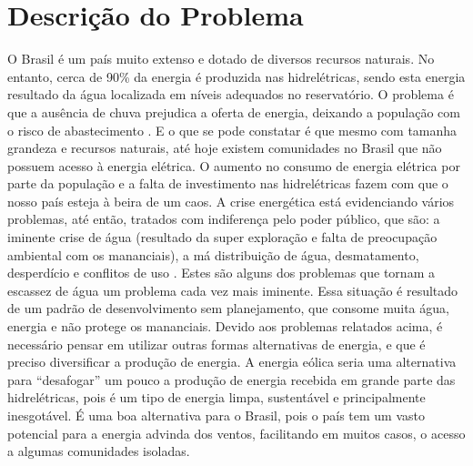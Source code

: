 \chapter[Descrição do Problema]{Descrição do Problema}

O Brasil é um país muito extenso e dotado de diversos recursos naturais. No entanto, cerca de 90\% da energia é produzida nas hidrelétricas, sendo esta energia  resultado da água localizada em níveis adequados no reservatório. O problema é que a ausência de chuva prejudica a oferta de energia, deixando a população com o risco de abastecimento . E o que se pode constatar é que mesmo com tamanha grandeza e recursos naturais, até hoje existem comunidades no Brasil que não possuem acesso à energia elétrica.
O aumento no consumo de energia elétrica por parte da população e a falta de investimento nas hidrelétricas fazem com que o nosso país esteja à beira de um caos. A crise energética está evidenciando vários problemas, até então, tratados com indiferença pelo poder público, que são: a iminente crise de água (resultado da super exploração e falta de preocupação ambiental com os mananciais), a má distribuição de água, desmatamento, desperdício e conflitos de uso . Estes são alguns dos problemas que tornam a escassez de água um problema cada vez mais iminente. Essa situação é resultado de um padrão de desenvolvimento sem planejamento, que consome muita água, energia e não protege os mananciais.
Devido aos problemas relatados acima, é necessário pensar em utilizar outras formas alternativas de energia, e que é preciso diversificar a produção de energia. A energia eólica seria uma alternativa para “desafogar” um pouco a produção de energia recebida em grande parte das hidrelétricas, pois é um tipo de energia limpa, sustentável e principalmente inesgotável. É uma boa alternativa para o Brasil, pois o país tem um vasto potencial para a energia advinda dos ventos, facilitando em muitos casos, o acesso a algumas comunidades isoladas. 
